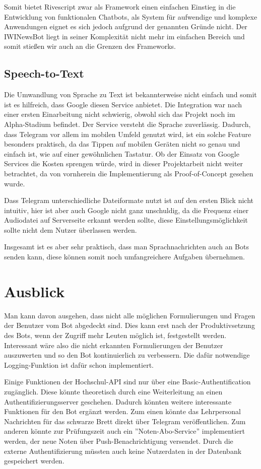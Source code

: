 Somit bietet Rivescript zwar als Framework einen einfachen Einstieg in die Entwicklung von funktionalen Chatbots, als System für aufwendige und komplexe Anwendungen eignet es sich jedoch aufgrund der genannten Gründe nicht. Der IWINewsBot liegt in seiner Komplexität nicht mehr im einfachen Bereich und somit stießen wir auch an die Grenzen des Frameworks.

\subsection{Speech-to-Text}
Die Umwandlung von Sprache zu Text ist bekannterweise nicht einfach und somit ist es hilfreich, dass Google diesen Service anbietet. Die Integration war nach einer ersten Einarbeitung nicht schwierig, obwohl sich das Projekt noch im Alpha-Stadium befindet. Der Service versteht die Sprache zuverlässig.
Dadurch, dass Telegram vor allem im mobilen Umfeld genutzt wird, ist ein solche Feature besonders praktisch, da das Tippen auf mobilen Geräten nicht so genau und einfach ist, wie auf einer gewöhnlichen Tastatur. Ob der Einsatz von Google Services die Kosten sprengen würde, wird in dieser Projektarbeit nicht weiter betrachtet, da von vornherein die Implementierung als Proof-of-Concept gesehen wurde.

Dass Telegram unterschiedliche Dateiformate nutzt ist auf den ersten Blick nicht intuitiv, hier ist aber auch Google nicht ganz unschuldig, da die Frequenz einer Audiodatei auf Serverseite erkannt werden sollte, diese Einstellungsmöglichkeit sollte nicht dem Nutzer überlassen werden.

Insgesamt ist es aber sehr praktisch, dass man Sprachnachrichten auch an Bots senden kann, diese können somit noch umfangreichere Aufgaben übernehmen.

\section{Ausblick}
Man kann davon ausgehen, dass nicht alle möglichen Formulierungen und Fragen der Benutzer vom Bot abgedeckt sind. Dies kann erst nach der Produktivsetzung des Bots, wenn der Zugriff mehr Leuten möglich ist, festgestellt werden. Interessant wäre also die nicht erkannten Formulierungen der Benutzer auszuwerten und so den Bot kontinuierlich zu verbessern. Die dafür notwendige Logging-Funktion ist dafür schon implementiert.

Einige Funktionen der Hochschul-API sind nur über eine Basic-Authentification zugänglich. Diese könnte theoretisch durch eine Weiterleitung an einen Authentifizierungsserver geschehen. Dadurch könnten weitere interessante Funktionen für den Bot ergänzt werden. Zum einen könnte das Lehrpersonal Nachrichten für das schwarze Brett direkt über Telegram veröffentlichen. Zum anderen könnte zur Prüfungszeit auch ein ''Noten-Abo-Service'' implementiert werden, der neue Noten über Push-Benachrichtigung versendet. Durch die externe Authentifizierung müssten auch keine Nutzerdaten in der Datenbank gespeichert werden.

